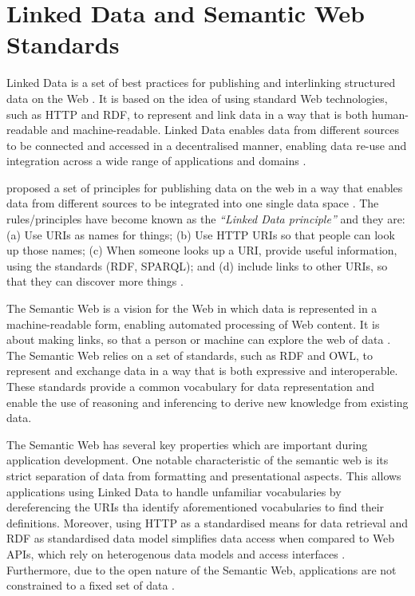 \section{Linked Data and Semantic Web Standards}

Linked Data is a set of best practices for publishing and interlinking structured data on the Web \citep*{bizer2011linkedData}.  It is based on the idea of using standard Web technologies, such as HTTP and RDF, to represent and link data in a way that is both human-readable and machine-readable.  Linked Data enables data from different sources to be connected and accessed in a decentralised manner, enabling data re-use and integration across a wide range of applications and domains \citep*{bizer2011linkedData}.

\citet{lee2006exploring} proposed a set of principles for publishing data on the web in a way that enables data from different sources to be integrated into one single data space \citep*{bizer2011linkedData}.  The rules/principles have become known as the \textit{``Linked Data principle''} and they are: (a) Use URIs as names for things; (b) Use HTTP URIs so that people can look up those names; (c) When someone looks up a URI, provide useful information, using the standards (RDF, SPARQL); and (d) include links to other URIs, so that they can discover more things \citetext{\citealp*{bizer2011linkedData}; \citealp{lee2006exploring}}.

The Semantic Web is a vision for the Web in which data is represented in a machine-readable form, enabling automated processing of Web content.  It is about making links, so that a person or machine can explore the web of data \citep*{bizer2011linkedData}.  The Semantic Web relies on a set of standards, such as RDF and OWL, to represent and exchange data in a way that is both expressive and interoperable.  These standards provide a common vocabulary for data representation and enable the use of reasoning and inferencing to derive new knowledge from existing data.

The Semantic Web has several key properties which are important during application development.  One notable characteristic of the semantic web is its strict separation of data from formatting and presentational aspects.  This allows applications using Linked Data to handle unfamiliar vocabularies by dereferencing the URIs tha identify aforementioned vocabularies to find their definitions.  Moreover, using HTTP as a standardised means for data retrieval and RDF as standardised data model simplifies data access when compared to Web APIs, which rely on heterogenous data models and access interfaces \citep*{bizer2011linkedData}.  Furthermore, due to the open nature of the Semantic Web, applications are not constrained to a fixed set of data \citep*{bizer2011linkedData}.

